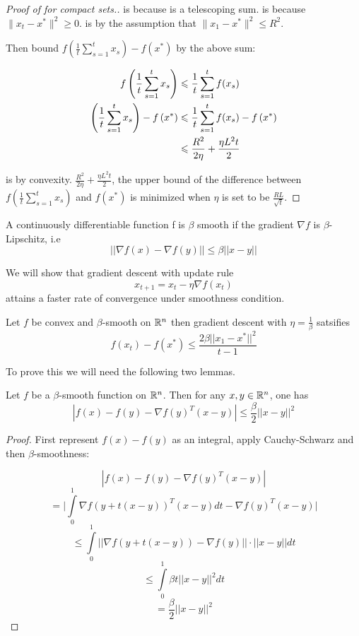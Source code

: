 \begin{proof}[Proof of  for compact sets.]
 is because  is a telescoping sum.
 is because $\lVert x_{t} - x^* \rVert^2 \geq 0$.
 is by the assumption that $\lVert x_1 - x^* \rVert^2 \leq R^2$.

Then bound $f\left(\frac{1}{t}\sum_{s=1}^t x_s\right) - f\left(x^*\right)$ by
the above sum:

\begin{align}
    f\left(\frac{1}{t}\sum_{s=1}^t x_s\right) &\leq \frac{1}{t} \sum_{s=1}^t f(x_s) \equationlabel{k} \\
    \left(\frac{1}{t}\sum_{s=1}^t x_s\right) - f\left(x^*\right) &\leq \frac{1}{t} \sum_{s=1}^t f(x_s) - f\left(x^*\right) \equationlabel{l} \\
    &\leq \frac{R^2}{2\eta} + \frac{\eta L^2 t}{2}
\end{align}

 is by convexity. $\frac{R^2}{2\eta} + \frac{\eta L^2 t}{2}$,
the upper bound of the difference between $f\left(\frac{1}{t}\sum_{s=1}^t
x_s\right)$ and $f\left(x^*\right)$ is minimized when $\eta$ is set to be
$\frac{RL}{\sqrt{t}}$. 

\end{proof}

A continuously differentiable function f is $\beta$ smooth if the gradient $\nabla f$ is $\beta$-Lipschitz, i.e
$$||\nabla f(x) - \nabla f(y)|| \leq \beta||x-y||$$

We will show that gradient descent  with update rule 
$$x_{t+1} = x_t - \eta \nabla f(x_t)$$
attains a faster rate of convergence under smoothness condition.  

\begin{theorem}
Let $f$ be convex and $\beta$-smooth on $\mathbb{R}^n$ then gradient descent with $\eta = \frac{1}{\beta}$ satsifies 
$$f(x_t) - f(x^*) \leq \frac{2\beta||x_1 - x^*||^2}{t-1}$$
\end{theorem}
To prove this we will need the following two lemmas.  

\begin{lemma}\label{l1}
Let $f$ be a $\beta$-smooth function on $\mathbb{R}^n$.  Then for any $x,y \in \mathbb{R}^n$, one has 
$$|f(x) - f(y) - \nabla f(y)^T(x-y)| \leq \frac{\beta}{2}||x-y||^2$$
\end{lemma}

\begin{proof}
First represent $f(x) - f(y)$ as an integral, apply Cauchy-Schwarz and then $\beta$-smoothness: 

$$|f(x) - f(y) - \nabla f(y)^T(x-y)|$$
$$= \big|\int\limits_{0}^1 \nabla f(y + t(x-y))^T(x-y)dt - \nabla f(y)^T(x-y)\big|$$
$$\leq  \int\limits_{0}^1 ||\nabla f(y + t(x-y)) - \nabla f(y)||\cdot ||x-y||dt$$
$$\leq \int\limits_{0}^1 \beta t||x-y||^2dt$$
$$= \frac{\beta}{2}||x-y||^2$$
\end{proof}

